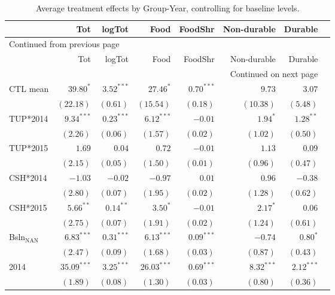 \documentclass[12pt,article]{article}
\begin{document}
\begin{longtable}{lrrrrrrr}
\caption{\label{tab:orgtable2}
Average treatment effects by Group-Year, controlling for baseline levels.}
\\
\hline
 & Tot & logTot & Food & FoodShr & Non-durable & Durable\\
\hline
\endfirsthead
\multicolumn{7}{l}{Continued from previous page} \\
\hline

 & Tot & logTot & Food & FoodShr & Non-durable & Durable \\

\hline
\endhead
\hline\multicolumn{7}{r}{Continued on next page} \\
\endfoot
\endlastfoot
\hline
CTL mean & \(39.80^{*}\) & \(3.52^{***}\) & \(27.46^{*}\) & \(0.70^{***}\) & \(9.73\) & \(3.07\)\\
 & \((22.18)\) & \(( 0.61)\) & \((15.54)\) & \(( 0.18)\) & \((10.38)\) & \(( 5.48)\)\\
\hline
TUP*2014 & \(9.34^{***}\) & \(0.23^{***}\) & \(6.12^{***}\) & \(-0.01\) & \(1.94^{*}\) & \(1.28^{**}\)\\
 & \(( 2.26)\) & \(( 0.06)\) & \(( 1.57)\) & \(( 0.02)\) & \(( 1.02)\) & \(( 0.50)\)\\
TUP*2015 & \(1.69\) & \(0.04\) & \(0.72\) & \(-0.01\) & \(1.13\) & \(0.09\)\\
 & \(( 2.15)\) & \(( 0.05)\) & \(( 1.50)\) & \(( 0.01)\) & \(( 0.96)\) & \(( 0.47)\)\\
CSH*2014 & \(-1.03\) & \(-0.02\) & \(-0.97\) & \(0.01\) & \(0.96\) & \(-0.38\)\\
 & \(( 2.80)\) & \(( 0.07)\) & \(( 1.95)\) & \(( 0.02)\) & \(( 1.28)\) & \(( 0.62)\)\\
CSH*2015 & \(5.66^{**}\) & \(0.14^{**}\) & \(3.50^{*}\) & \(-0.01\) & \(2.17^{*}\) & \(0.06\)\\
 & \(( 2.75)\) & \(( 0.07)\) & \(( 1.91)\) & \(( 0.02)\) & \(( 1.24)\) & \(( 0.61)\)\\
Bsln\(_{\text{NAN}}\) & \(6.83^{***}\) & \(0.31^{***}\) & \(6.13^{***}\) & \(0.09^{***}\) & \(-0.74\) & \(0.80^{*}\)\\
 & \(( 2.47)\) & \(( 0.09)\) & \(( 1.68)\) & \(( 0.03)\) & \(( 0.87)\) & \(( 0.43)\)\\
2014 & \(35.09^{***}\) & \(3.25^{***}\) & \(26.03^{***}\) & \(0.69^{***}\) & \(8.32^{***}\) & \(2.12^{***}\)\\
 & \(( 1.89)\) & \(( 0.08)\) & \(( 1.30)\) & \(( 0.03)\) & \(( 0.80)\) & \(( 0.36)\)\\

\end{longtable}
\end{document}
